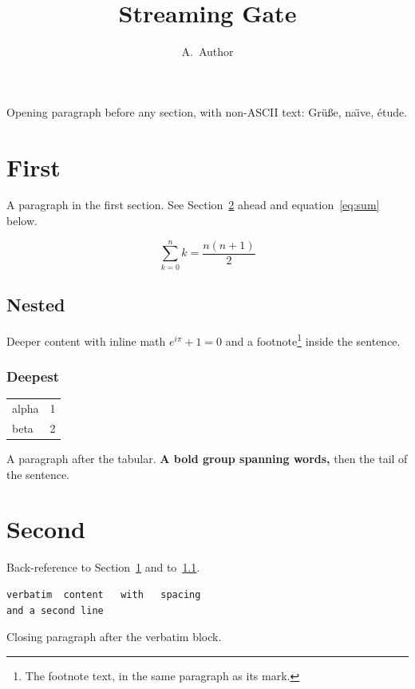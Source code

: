 \documentclass{article}
\title{Streaming Gate}
\author{A.\ Author}
\begin{document}
\maketitle

Opening paragraph before any section, with non-ASCII text: Gr\"u\ss e, na\"{\i}ve, \'etude.

\section{First}\label{sec:first}

A paragraph in the first section. See Section~\ref{sec:second} ahead and
equation~\ref{eq:sum} below.

\begin{equation}\label{eq:sum}
\sum_{k=0}^{n} k = \frac{n(n+1)}{2}
\end{equation}

\subsection{Nested}\label{sec:nested}

Deeper content with inline math $e^{i\pi}+1=0$ and a
footnote\footnote{The footnote text, in the same paragraph as its mark.}
inside the sentence.

\subsubsection{Deepest}

\begin{tabular}{lr}
alpha & 1 \\
beta  & 2 \\
\end{tabular}

A paragraph after the tabular. {\bfseries A bold group spanning
words,} then the tail of the sentence.

\section{Second}\label{sec:second}

Back-reference to Section~\ref{sec:first} and to~\ref{sec:nested}.

\begin{verbatim}
verbatim  content   with   spacing
and a second line
\end{verbatim}

Closing paragraph after the verbatim block.
\end{document}
